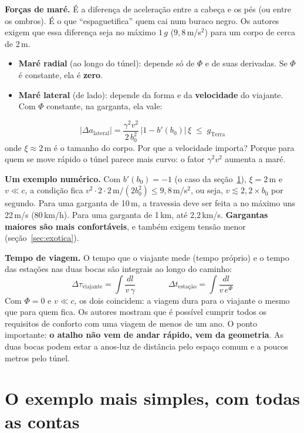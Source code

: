 \documentclass[11pt,a4paper]{article}
\begin{document}
\textbf{Forças de maré.} É a diferença de aceleração entre a cabeça e os pés (ou entre os ombros). É o que
``espaguetifica'' quem cai num buraco negro. Os autores exigem que essa diferença seja no máximo $1\,g$
($9{,}8$\,m/s$^2$) para um corpo de cerca de 2\,m.
\begin{itemize}[nosep]
\item \textbf{Maré radial} (ao longo do túnel): depende só de $\Phi$ e de suas derivadas. Se $\Phi$ é constante, ela é
\textbf{zero}.
\item \textbf{Maré lateral} (de lado): depende da forma e da \textbf{velocidade} do viajante. Com $\Phi$ constante, na
garganta, ela vale:
\end{itemize}
\begin{equation*}
|\Delta a_{\text{lateral}}| = \frac{\gamma^2 v^2}{2\,b_0^2}\,\left|1 - b'(b_0)\right|\,\xi \;\le\; g_{\text{Terra}}
\end{equation*}
onde $\xi \approx 2$\,m é o tamanho do corpo. Por que a velocidade importa? Porque para quem se move rápido o túnel
parece mais curvo: o fator $\gamma^2 v^2$ aumenta a maré.

\textbf{Um exemplo numérico.} Com $b'(b_0) = -1$ (o caso da seção~\ref{sec:exemplo}), $\xi = 2$\,m e $v \ll c$, a
condição fica $v^2 \cdot 2 \cdot 2\,\text{m}/(2 b_0^2) \le 9{,}8$\,m/s$^2$, ou seja,
$v \lesssim 2{,}2\times b_0$ por segundo. Para uma garganta de 10\,m, a travessia deve ser feita a no máximo uns
22\,m/s (80\,km/h). Para uma garganta de 1\,km, até 2,2\,km/s. \textbf{Gargantas maiores são mais confortáveis}, e
também exigem tensão menor (seção~\ref{sec:exotica}).

\textbf{Tempo de viagem.} O tempo que o viajante mede (tempo próprio) e o tempo das estações nas duas bocas são
integrais ao longo do caminho:
\begin{equation*}
\Delta\tau_{\text{viajante}} = \int \frac{dl}{v\,\gamma} \qquad\qquad
\Delta t_{\text{estação}} = \int \frac{dl}{v\,e^{\Phi}}
\end{equation*}
Com $\Phi = 0$ e $v \ll c$, os dois coincidem: a viagem dura para o viajante o mesmo que para quem fica. Os autores
mostram que é possível cumprir todos os requisitos de conforto com uma viagem de menos de um ano. O ponto importante:
\textbf{o atalho não vem de andar rápido, vem da geometria}. As duas bocas podem estar a anos-luz de distância pelo
espaço comum e a poucos metros pelo túnel.

\section{O exemplo mais simples, com todas as contas}
\label{sec:exemplo}
\end{document}
